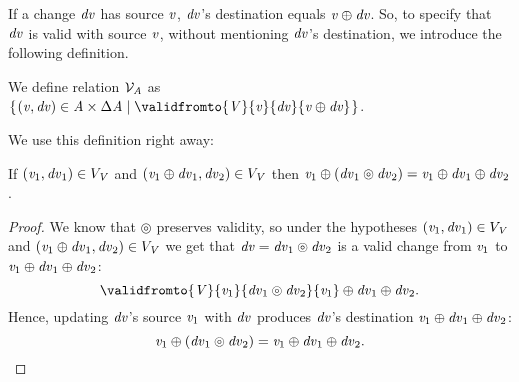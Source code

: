 If a change \ensuremath{\Varid{dv}} has source \ensuremath{\Varid{v}}, \ensuremath{\Varid{dv}}'s destination equals \ensuremath{\Varid{v}\oplus \Varid{dv}}.
So, to specify that \ensuremath{\Varid{dv}} is valid with source \ensuremath{\Varid{v}}, without mentioning \ensuremath{\Varid{dv}}'s
destination, we introduce the following definition.
\begin{definition}
  We define relation \ensuremath{\mathcal{V}_{\Conid{A}}} as
  \ensuremath{\{\mskip1.5mu (\Varid{v},\Varid{dv})\in \Conid{A}\times\Delta \Conid{A}\mid\validfromto{\Conid{V}}{\Varid{v}}{\Varid{dv}}{\Varid{v}\oplus \Varid{dv}}\mskip1.5mu\}}.
\end{definition}

We use this definition right away:
\begin{lemma}
  If \ensuremath{(\Varid{v}_{1} , \Varid{dv}_{1}) \in V_{\Conid{V}}} and \ensuremath{(\Varid{v}_{1}\oplus \Varid{dv}_{1} , \Varid{dv}_{2}) \in V_{\Conid{V}}} then
  \ensuremath{\Varid{v}_{1}\oplus (\Varid{dv}_{1}\circledcirc\Varid{dv}_{2})\mathrel{=}\Varid{v}_{1}\oplus \Varid{dv}_{1}\oplus \Varid{dv}_{2}}.
\end{lemma}
\begin{proof}
  We know that \ensuremath{\circledcirc } preserves validity, so under the
  hypotheses \ensuremath{(\Varid{v}_{1} , \Varid{dv}_{1}) \in V_{\Conid{V}}} and \ensuremath{(\Varid{v}_{1}\oplus \Varid{dv}_{1} , \Varid{dv}_{2}) \in V_{\Conid{V}}}
  we get that \ensuremath{\Varid{dv}\mathrel{=}\Varid{dv}_{1}\circledcirc\Varid{dv}_{2}} is a valid change from
  \ensuremath{\Varid{v}_{1}} to \ensuremath{\Varid{v}_{1}\oplus \Varid{dv}_{1}\oplus \Varid{dv}_{2}}:
  \[\ensuremath{\validfromto{\Conid{V}}{\Varid{v}_{1}}{\Varid{dv}_{1}\circledcirc\Varid{dv}_{2}}{\Varid{v}_{1}}\oplus \Varid{dv}_{1}\oplus \Varid{dv}_{2}}.\]
  Hence, updating \ensuremath{\Varid{dv}}'s source \ensuremath{\Varid{v}_{1}} with \ensuremath{\Varid{dv}}
  produces \ensuremath{\Varid{dv}}'s destination \ensuremath{\Varid{v}_{1}\oplus \Varid{dv}_{1}\oplus \Varid{dv}_{2}}:
  \[\mathit{v}_{1}\oplus (\mathit{dv}_{1}\circledcirc\mathit{dv}_{2})\mathrel{=}\mathit{v}_{1}\oplus \mathit{dv}_{1}\oplus \mathit{dv}_{2}.\]
\end{proof}


